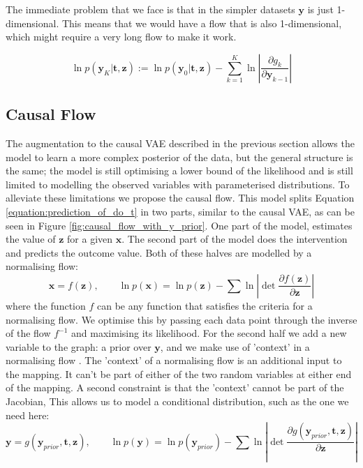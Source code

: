 \documentclass{report}
\newcommand{\bt}{\mathbf{t}}
\newcommand{\bx}{\mathbf{x}}
\newcommand{\by}{\mathbf{y}}
\newcommand{\bz}{\mathbf{z}}
\newcommand{\parfrac}[2]{\frac{\partial #1}{\partial#2}}
\begin{document}
The immediate problem that we face is that in the simpler datasets $\by$ is just 1-dimensional. This means that we would have a flow that is also 1-dimensional, which might require a very long flow to make it work.

\begin{equation}
    \ln p(\by_K|\bt, \bz) := \ln p(\by_0|\bt, \bz) - \sum\limits^K_{k=1} \ln \left | \parfrac{g_k}{\by_{k-1}} \right|
\end{equation}



\subsection{Causal Flow}
The augmentation to the causal VAE described in the previous section allows the model to learn a more complex posterior of the data, but the general structure is the same; the model is still optimising a lower bound of the likelihood and is still limited to modelling the observed variables with parameterised distributions. To alleviate these limitations we propose the causal flow. This model splits Equation \ref{equation:prediction_of_do_t} in two parts, similar to the causal VAE, as can be seen in Figure \ref{fig:causal_flow_with_y_prior}. One part of the model, estimates the value of $\bz$ for a given $\bx$. The second part of the model does the intervention and predicts the outcome value. Both of these halves are modelled by a normalising flow:
\begin{equation}
    \bx = f(\bz), \qquad \ln p(\bx) = \ln p(\bz) - \sum \ln \left|\det \parfrac{f(\bz)}{\bz}\right| 
\end{equation}
where the function $f$ can be any function that satisfies the criteria for a normalising flow. We optimise this by passing each data point through the inverse of the flow $f^{-1}$ and maximising its likelihood. For the second half we add a new variable to the graph: a prior over $\by$, and we make use of 'context' in a normalising flow \cite{papamakarios2019normalizing} \cite{dinh2016density}. The 'context' of a normalising flow is an additional input to the mapping. It can't be part of either of the two random variables at either end of the mapping. A second constraint is that the 'context' cannot be part of the Jacobian, %
This allows us to model a conditional distribution, such as the one we need here:
\begin{equation}
    \by = g(\by_{prior}, \bt, \bz), \qquad \ln p(\by) = \ln p(\by_{prior}) - \sum \ln \left|\det \parfrac{g(\by_{prior}, \bt, \bz)}{\bz}\right| 
\end{equation}
\end{document}
